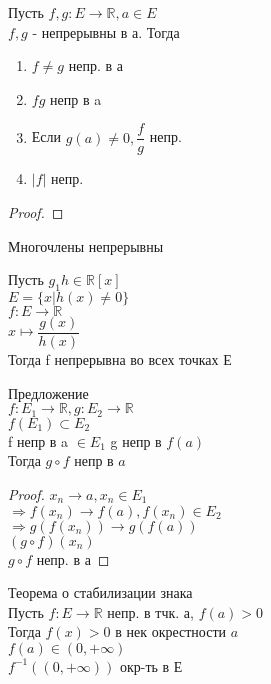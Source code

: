 \begin{properties}
	Пусть $ f, g : E \rightarrow \mathbb{R}, a \in E$ \\
	 $ f, g $ - непрерывны в а. Тогда \\
	 \begin{enumerate}
	 	\item $ f \neq g $ непр. в а
	 	\item $ fg $ непр в a 
	 	\item Если  $ g(a) \neq 0, \dfrac{f}{g} $ непр.
	 	\item $|f|$ непр. 
	 \end{enumerate}
 	\begin{proof}
 	\end{proof}
	Многочлены непрерывны
	\begin{consequence}
		Пусть $ g_1 h \in \mathbb{R}[x] $ \\
		$ E = \{ x | h(x) \neq 0 \} $ \\
		$ f : E \rightarrow \mathbb{R} $ \\
		$ x \mapsto \dfrac{g(x)}{h(x)} $ \\
		Тогда f непрерывна во всех точках Е \\
		
 	\end{consequence}
 Предложение \\
 $ f : E_1 \rightarrow \mathbb{R} , g : E_2 \rightarrow \mathbb{R}$ \\
 $ f(E_1) \subset E_2 $ \\
 f непр в a  $ \in E_1 $ g непр  в $ f(a)$\\
 Тогда $ g \circ f $ непр в $ a $ \\
 \begin{proof}
 	$ x_n \rightarrow a, x_n \in E_1 $ \\
 	$ \Rightarrow f(x_n) \rightarrow f(a), f(x_n) \in E_2 $\\
 	$ \Rightarrow g(f(x_n))  \rightarrow g(f(a))$ \\
 	$ (g\circ f) (x_n) $\\
 	$ g \circ f $ непр. в а 	
 \end{proof}
  \begin{theorem}
  	Теорема о стабилизации знака \\
  	Пусть $ f : E \rightarrow \mathbb{R}  $ непр. в тчк. а, $ f(a) > 0$\\
  	Тогда $ f(x) > 0 $ в нек окрестности $a$ \\
  	$ f(a) \in (0, +\infty) $ \\
  	$ f^{-1} ((0, +\infty)) $ окр-ть в Е
  \end{theorem}
\end{properties} 

